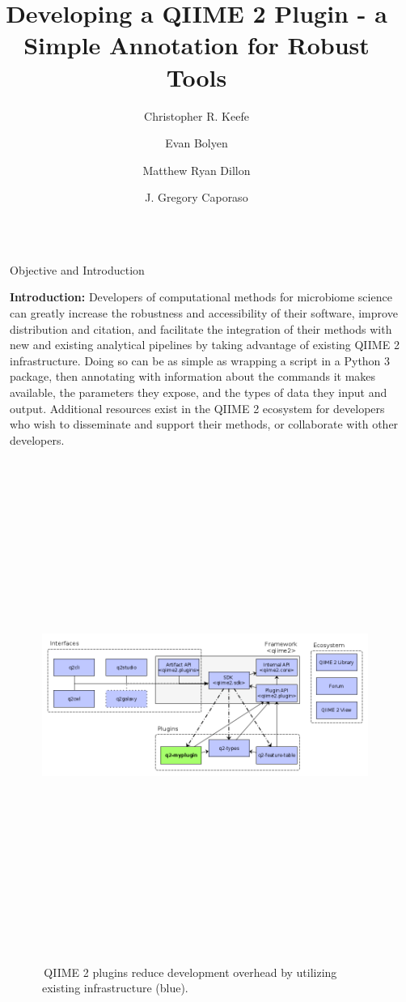 \documentclass[final]{beamer}
\title{Developing a QIIME 2 Plugin - a Simple Annotation for Robust Tools}
\author{Christopher R. Keefe \and Evan Bolyen \and Matthew Ryan Dillon \and J. Gregory Caporaso}
\institute[shortinst]{The Center for Applied Microbiome Science, Pathogen and Microbiome Institute, Northern Arizona University}
\newlength{\sepwidth}
\newlength{\colwidth}
\newcommand{\separatorcolumn}{\begin{column}{\sepwidth}\end{column}}
\begin{document}
\begin{frame}[t]
\begin{columns}[t]
\separatorcolumn

\begin{column}{\colwidth}

  \begin{block}{Objective and Introduction}

    \textbf{Introduction:}
    Developers of computational methods for microbiome science can greatly increase
    the robustness and accessibility of their software, improve distribution and citation,
    and facilitate the integration of their methods with new and existing analytical
    pipelines by taking advantage of existing QIIME 2 \cite{10.7287/peerj.preprints.27295v1}
    infrastructure. Doing so can be as simple as wrapping a script in a Python 3
    package, then annotating with information about the commands it makes available, the
    parameters they expose, and the types of data they input and output. Additional
    resources exist in the QIIME 2 ecosystem for developers who wish to disseminate and
    support their methods, or collaborate with other developers.
    \hfill\break

    \begin{figure}[tph!]
    {\includegraphics[height=16cm]{assets/infrastructure_diagram_bicolor}}
    \caption{\,QIIME 2 plugins reduce development overhead by utilizing existing infrastructure (blue).}
    \label{fig:infrastructure}
    \end{figure}


\end{block}
\end{column}
\end{columns}
\end{frame}
\end{document}
